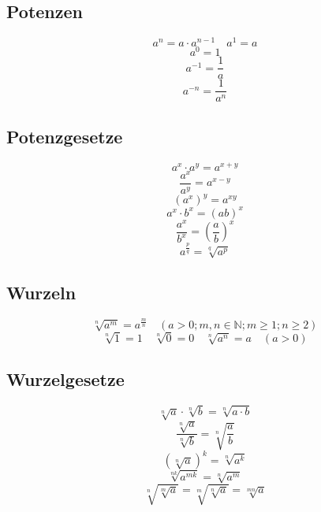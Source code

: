 \subsection{Potenzen}
\[ \boxed{a^n = a \cdot a^{n-1} \quad a^1 = a} \]
\[ \boxed{a^0 = 1 }\] %
\[ \boxed{a^{-1} = \frac{1}{a}} \]
\[ \boxed{a^{-n} = \frac{1}{a^n}} \]

\subsection{Potenzgesetze}
\[ \boxed{a^x \cdot a^y = a^{x+y}} \]
\[ \boxed{\frac{a^x}{a^y} = a^{x-y}} \]
\[ \boxed{(a^x)^y = a^{xy}} \]
\[ \boxed{a^x \cdot b^x = \left(ab\right)^x} \]
\[ \boxed{\frac{a^x}{b^x} = \left(\frac{a}{b}\right)^x} \]
\[ \boxed{a^{\frac{p}{q}} = \sqrt[q]{a^p}} \]

\subsection{Wurzeln}
\[ \boxed{\sqrt[n]{a^m} = a^{\frac{m}{n}} \quad \left(a>0; m, n \in \mathbb{N}; 
m \geq 1; n \geq 2\right)} \]
\[ \boxed{\sqrt[n]{1}=1 \quad \sqrt[n]{0}=0 \quad \sqrt[n]{a^n}=a 
\quad \left(a>0\right)} \]

\subsection{Wurzelgesetze}
\[ \boxed{\sqrt[n]{a}\cdot \sqrt[n]{b}=\sqrt[n]{a\cdot b}} \]
\[ \boxed{\frac{\sqrt[n]{a}}{\sqrt[n]{b}}=\sqrt[n]{\frac{a}{b}}} \]
\[ \boxed{\left(\sqrt[n]{a}\right)^k=\sqrt[n]{a^k}} \]
\[ \boxed{\sqrt[nk]{a^{mk}}=\sqrt[n]{a^m}} \]
\[ \boxed{\sqrt[n]{\sqrt[m]{a}}=\sqrt[m]{\sqrt[n]{a}}=\sqrt[mn]{a}} \]

